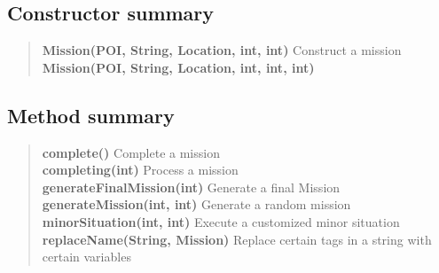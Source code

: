 {{\subsection{Constructor summary}{
\begin{verse}
{\bf Mission(POI, String, Location, int, int)} Construct a mission\\
{\bf Mission(POI, String, Location, int, int, int)} \\
\end{verse}
}
\subsection{Method summary}{
\begin{verse}
{\bf complete()} Complete a mission\\
{\bf completing(int)} Process a mission\\
{\bf generateFinalMission(int)} Generate a final Mission\\
{\bf generateMission(int, int)} Generate a random mission\\
{\bf minorSituation(int, int)} Execute a customized minor situation\\
{\bf replaceName(String, Mission)} Replace certain tags in a string with certain variables\\
\end{verse}
}
}}
